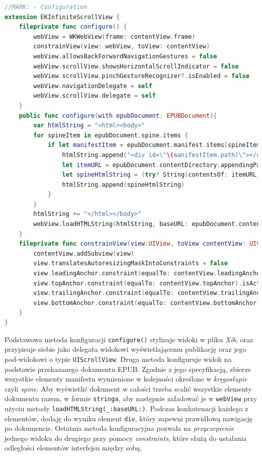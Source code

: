 \begin{lstlisting}[language=swift,caption={Rozszerzenie klasy \texttt{EKInfiniteScrollView} o metody konfiguracji}, label=EKInfiniteScrollView-extension-1]
//MARK: - Configuration
extension EKInfiniteScrollView {
    fileprivate func configure() {
        webView = WKWebView(frame: contentView.frame)
        constrainView(view: webView, toView: contentView)
        webView.allowsBackForwardNavigationGestures = false
        webView.scrollView.showsHorizontalScrollIndicator = false
        webView.scrollView.pinchGestureRecognizer?.isEnabled = false
        webView.navigationDelegate = self
        webView.scrollView.delegate = self
    }
    public func configure(with epubDocument: EPUBDocument){
        var htmlString = "<html><body>"
        for spineItem in epubDocument.spine.items {
            if let manifestItem = epubDocument.manifest.items[spineItem.idref] {
                htmlString.append("<div id=\"\(manifestItem.path)\"></div>")
                let itemURL = epubDocument.contentDirectory.appendingPathComponent(manifestItem.path)
                let spineHtmlString = (try? String(contentsOf: itemURL)) ?? ""
                htmlString.append(spineHtmlString)
            }
        }
        htmlString += "</html></body>"
        webView.loadHTMLString(htmlString, baseURL: epubDocument.contentDirectory)
    }
    fileprivate func constrainView(view:UIView, toView contentView: UIView) {
        contentView.addSubview(view)
        view.translatesAutoresizingMaskIntoConstraints = false
        view.leadingAnchor.constraint(equalTo: contentView.leadingAnchor).isActive = true
        view.topAnchor.constraint(equalTo: contentView.topAnchor).isActive = true
        view.trailingAnchor.constraint(equalTo: contentView.trailingAnchor).isActive = true
        view.bottomAnchor.constraint(equalTo: contentView.bottomAnchor).isActive = true
    }
}
\end{lstlisting}

Podstawowa metoda konfiguracji \texttt{configure()} stylizuje widoki w pliku \textit{Xib}, oraz przypisuje siebie jako delegata widokowi wyświetlającemu publikację oraz jego pod-widokowi o typie \texttt{UIScrollView}. Druga metoda konfiguruje widok na podstawie przekazanego dokumentu EPUB. Zgodnie z jego specyfikacją, zbierze wszystkie elementy manifestu wymienione w kolejności określone w \textit{kręgosłupie} czyli \textit{spine}. Aby wyświetlić dokument w całości trzeba scalić wszystkie elementy dokumentu razem, w formie \texttt{stringa}, aby następnie załadować je w \texttt{webView} przy użyciu metody \texttt{loadHTMLString(\_:baseURL:)}. Podczas konkatenacji każdego z elementów, dodaję do wyniku element \texttt{div}, który zapewni prawidłową nawigację po dokumencie. Ostatnia metoda konfiguracyjna pozwala na \textit{przyczepienie} jednego widoku do drugiego przy pomocy \textit{constraints}, które służą do ustalania odległości elementów interfejsu między sobą.


